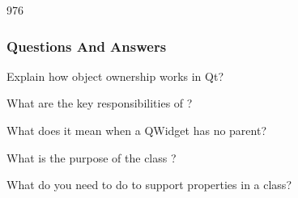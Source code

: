 \begin{slide}[fragile]{976}
  \frametitle{Questions And Answers}\label{parentChildQuestions}
  \begin{questionize}
  \item Explain how object ownership works in Qt?
  \item What are the key responsibilities of ?
  \item What does it mean when a QWidget has no parent?
  \item What is the purpose of the class ?
  \item What do you need to do to support properties in a class?
 \end{questionize}
\end{slide}
